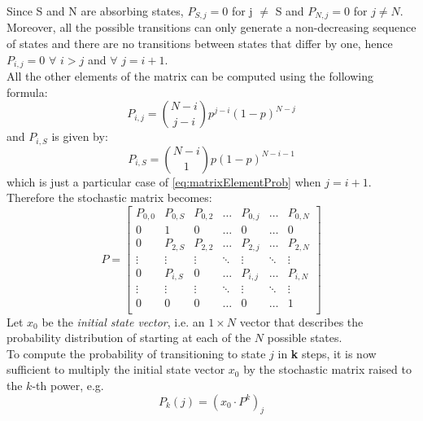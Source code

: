 Since S and N are absorbing states, $P_{S,j}=0$ for j $\neq$ S and $P_{N,j} = 0$
for $j \neq N$.\\
Moreover, all the possible transitions can only generate a non-decreasing
sequence of states and there are no transitions between states that differ by
one, hence\\
$P_{i, j} = 0$ $\forall$ $i > j$ and $\forall$ $j = i + 1$.\\
All the other elements of the matrix can be computed using the following formula:
\begin{equation}
    P_{i,j} = {N-i\choose j - i} p^{j - i} (1-p)^{N - j}
    \label{eq:matrixElementProb}
\end{equation}
and $P_{i,S}$ is given by:
\begin{equation}
    P_{i,S} = {N-i\choose 1} p(1-p)^{N - i - 1}
    \label{eq:matrixProbToS}
\end{equation}
which is just a particular case of \eqref{eq:matrixElementProb} when $j = i + 1$.\\
Therefore the stochastic matrix becomes:
\begin{equation*}
P = 
\begin{bmatrix}
P_{0,0}	& P_{0,S}	& P_{0,2}	& \dots  	& P_{0,j}	& \dots		& P_{0,N} \\
0		& 1			& 0			& \dots  	& 0			& \dots		& 0		 \\
0		& P_{2,S}	& P_{2,2}	& \dots  	& P_{2,j}	& \dots		& P_{2,N} \\
\vdots	& \vdots	& \vdots	& \ddots 	& \vdots	& \ddots	& \vdots \\
0		& P_{i,S}	& 0			& \dots		& P_{i,j}	& \dots		& P_{i,N} \\
\vdots	& \vdots	& \vdots	& \ddots	& \vdots	& \ddots	& \vdots \\
0		& 0			& 0			& \dots  	& 0			& \dots		& 1		 \\
\end{bmatrix}
\label{stochasticMatrix2}
\end{equation*}
Let $x_{0}$ be the \textit{initial state vector}, i.e. an $1 \times N$ vector
that describes the probability distribution of starting at each of the $N$
possible states.\\
To compute the probability of transitioning to state $j$ in \textbf{k} steps, it
is now sufficient to multiply the initial state vector $x_{0}$ by the stochastic
matrix raised to the $k$-th power, e.g.
\begin{equation}\label{probAtStateK1}
P_{k}(j) = (x_{0}\cdot P^{k})_{j}
\end{equation}
